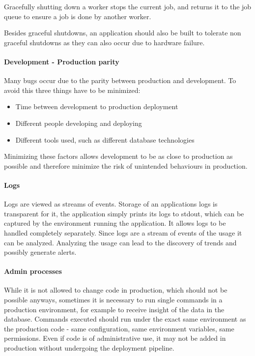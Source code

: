Gracefully shutting down a worker stops the current job, and returns it to the
job queue to ensure a job is done by another worker.

Besides graceful shutdowns, an application should also be built to tolerate non
graceful shutdowns as they can also occur due to hardware failure.

\paragraph{Development - Production parity}

Many bugs occur due to the parity between production and development. To avoid
this three things have to be minimized:

\begin{itemize}
  \item{Time between development to production deployment}
  \item{Different people developing and deploying}
  \item{Different tools used, such as different database technologies}
\end{itemize}

Minimizing these factors allows development to be as close to production as
possible and therefore minimize the risk of unintended behaviours in
production.

\paragraph{Logs}

Logs are viewed as streams of events. Storage of an applications logs is
transparent for it, the application simply prints its logs to stdout, which can
be captured by the environment running the application. It allows logs to be
handled completely separately. Since logs are a stream of events of the usage
it can be analyzed. Analyzing the usage can lead to the discovery of trends and
possibly generate alerts.

\paragraph{Admin processes}

While it is not allowed to change code in production, which should not be
possible anyways, sometimes it is necessary to run single commands in a
production environment, for example to receive insight of the data in the
database. Commands executed should run under the exact same environment as the
production code - same configuration, same environment variables, same
permissions. Even if code is of administrative use, it may not be added in
production without undergoing the deployment pipeline.


